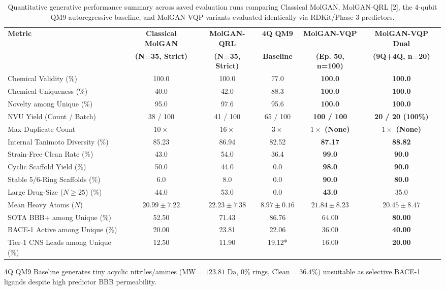 \documentclass[10pt,a4paper]{article}
\begin{document}
\begin{table}[!htbp]
\centering
\caption{Quantitative generative performance summary across saved evaluation runs comparing Classical MolGAN, MolGAN-QRL [2], the 4-qubit QM9 autoregressive baseline, and MolGAN-VQP variants evaluated identically via RDKit/Phase 3 predictors.}
\label{tab:gen_perf}
\setlength{\tabcolsep}{4pt}
\footnotesize
\begin{tabularx}{\textwidth}{@{}>{\raggedright\arraybackslash}X ccccc@{}}
\toprule
\textbf{Metric} & \textbf{Classical MolGAN} & \textbf{MolGAN-QRL} & \textbf{4Q QM9} & \textbf{MolGAN-VQP} & \textbf{MolGAN-VQP Dual} \\
 & \textbf{(N=35, Strict)} & \textbf{(N=35, Strict)} & \textbf{Baseline} & \textbf{(Ep. 50, n=100)} & \textbf{(9Q+4Q, n=20)} \\
\midrule
Chemical Validity (\%) & 100.0 & 100.0 & 77.0 & \textbf{100.0} & \textbf{100.0} \\
Chemical Uniqueness (\%) & 40.0 & 42.0 & 88.3 & \textbf{100.0} & \textbf{100.0} \\
Novelty among Unique (\%) & 95.0 & 97.6 & 95.6 & \textbf{100.0} & \textbf{100.0} \\
NVU Yield (Count / Batch) & 38 / 100 & 41 / 100 & 65 / 100 & \textbf{100 / 100} & \textbf{20 / 20 (100\%)} \\
Max Duplicate Count & $10\times$ & $16\times$ & $3\times$ & \textbf{$1\times$ (None)} & \textbf{$1\times$ (None)} \\
Internal Tanimoto Diversity (\%) & 85.23 & 86.94 & 82.52 & \textbf{87.17} & \textbf{88.82} \\
\rowcolor{lightgray}
Strain-Free Clean Rate (\%) & 43.0 & 54.0 & 36.4 & \textbf{99.0} & \textbf{90.0} \\
Cyclic Scaffold Yield (\%) & 50.0 & 44.0 & 0.0 & \textbf{98.0} & \textbf{90.0} \\
\rowcolor{lightgray}
Stable 5/6-Ring Scaffolds (\%) & 6.0 & 8.0 & 0.0 & \textbf{90.0} & \textbf{80.0} \\
Large Drug-Size ($N \ge 25$) (\%) & 44.0 & 53.0 & 0.0 & \textbf{43.0} & 35.0 \\
Mean Heavy Atoms ($N$) & $20.99 \pm 7.22$ & $22.23 \pm 7.38$ & $8.97 \pm 0.16$ & $21.84 \pm 8.23$ & $20.45 \pm 8.47$ \\
SOTA BBB+ among Unique (\%) & 52.50 & 71.43 & 86.76 & 64.00 & \textbf{80.00} \\
BACE-1 Active among Unique (\%) & 20.00 & 23.81 & 22.06 & 36.00 & \textbf{40.00} \\
\rowcolor{lightgray}
Tier-1 CNS Leads among Unique (\%) & 12.50 & 11.90 & 19.12* & 16.00 & \textbf{20.00} \\
\bottomrule
\end{tabularx}
\par\vspace{0.12cm}
\raggedright\footnotesize *4Q QM9 Baseline generates tiny acyclic nitriles/amines ($\mathrm{MW}=123.81\text{ Da}$, $0\%$ rings, $\mathrm{Clean}=36.4\%$) unsuitable as selective BACE-1 ligands despite high predictor BBB permeability.
\end{table}
\end{document}
